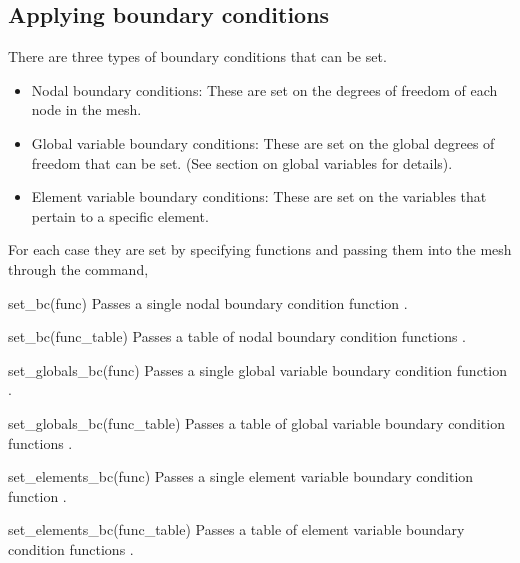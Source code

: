 \subsection{Applying boundary conditions}
There are three types of boundary conditions that can be set.
\begin{itemize}
\item Nodal boundary conditions: These are set on the degrees of 
      freedom of each node in the mesh.
\item Global variable boundary conditions: These are set on the 
      global degrees of freedom that can be set. (See section on
      global variables for details).
\item Element variable boundary conditions: These are set on the
      variables that pertain to a specific element. 
\end{itemize}
For each case they are set by specifying functions and passing them
into the mesh through the command,
\begin{codelist}

  \item[set\_bc(func)] Passes a single nodal boundary condition 
  function .

  \item[set\_bc(func\_table)] Passes a table of nodal boundary condition
  functions .

  \item[set\_globals\_bc(func)] Passes a single global variable boundary 
  condition function .

  \item[set\_globals\_bc(func\_table)] Passes a table of global variable
  boundary condition functions 
  .

  \item[set\_elements\_bc(func)] Passes a single element variable boundary 
  condition function .
  
  \item[set\_elements\_bc(func\_table)] Passes a table of element variable
  boundary condition functions 
  .

\end{codelist}

